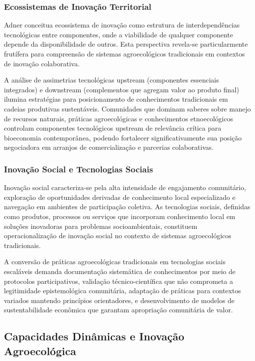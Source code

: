 \subsubsection{Ecossistemas de Inovação Territorial}

Adner \cite{Adner2006} conceitua ecossistema de inovação como estrutura de interdependências tecnológicas entre componentes, onde a viabilidade de qualquer componente depende da disponibilidade de outros. Esta perspectiva revela-se particularmente frutífera para compreensão de sistemas agroecológicos tradicionais em contextos de inovação colaborativa.

A análise de assimetrias tecnológicas upstream (componentes essenciais integrados) e downstream (complementos que agregam valor ao produto final) \cite{AdnerKapoor2010} ilumina estratégias para posicionamento de conhecimentos tradicionais em cadeias produtivas sustentáveis. Comunidades que dominam saberes sobre manejo de recursos naturais, práticas agroecológicas e conhecimentos etnoecológicos controlam componentes tecnológicos upstream de relevância crítica para bioeconomia contemporânea, podendo fortalecer significativamente sua posição negociadora em arranjos de comercialização e parcerias colaborativas.

\subsubsection{Inovação Social e Tecnologias Sociais}

Inovação social caracteriza-se pela alta intensidade de engajamento comunitário, exploração de oportunidades derivadas de conhecimento local especializado e navegação em ambientes de participação coletiva. As tecnologias sociais, definidas como produtos, processos ou serviços que incorporam conhecimento local em soluções inovadoras para problemas socioambientais, constituem operacionalização de inovação social no contexto de sistemas agroecológicos tradicionais.

A conversão de práticas agroecológicas tradicionais em tecnologias sociais escaláveis demanda documentação sistemática de conhecimentos por meio de protocolos participativos, validação técnico-científica que não comprometa a legitimidade epistemológica comunitária, adaptação de práticas para contextos variados mantendo princípios orientadores, e desenvolvimento de modelos de sustentabilidade econômica que garantam apropriação comunitária de valor.

\subsection{Capacidades Dinâmicas e Inovação Agroecológica}

